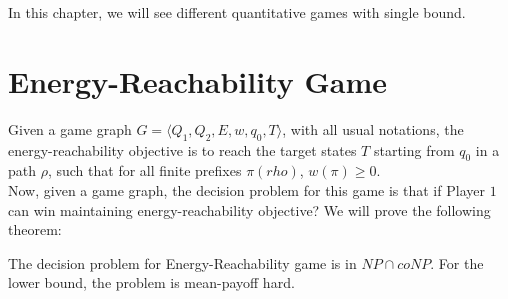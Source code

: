 In this chapter, we will see different quantitative games with single bound. \\

\section{Energy-Reachability Game}
Given a game graph $G=\langle Q_1, Q_2, E, w, q_0, T \rangle$, with all usual notations, the energy-reachability objective is to reach the target states $T$ starting from $q_0$ in a path $\rho$, such that for all finite prefixes $\pi(rho)$, $w(\pi) \geq 0$.\\

Now, given a game graph, the decision problem for this game is that if Player $1$ can win maintaining energy-reachability objective? We will prove the following theorem:\\
\begin{theorem}
\label{energy-reach-thm}
The decision problem for Energy-Reachability game is in $NP \cap coNP$. For the lower bound, the problem is mean-payoff hard.
\end{theorem}
